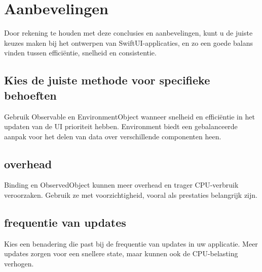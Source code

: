 \newpage
\section{Aanbevelingen}
Door rekening te houden met deze conclusies en aanbevelingen, kunt u de juiste keuzes maken bij het ontwerpen van SwiftUI-applicaties, en zo een goede balans vinden tussen efficiëntie, snelheid en consistentie.
\subsection{Kies de juiste methode voor specifieke behoeften}
Gebruik Observable en EnvironmentObject wanneer snelheid en efficiëntie in het updaten van de UI prioriteit hebben.
Environment biedt een gebalanceerde aanpak voor het delen van data over verschillende componenten heen.
\subsection{overhead}
Binding en ObservedObject kunnen meer overhead en trager CPU-verbruik veroorzaken. Gebruik ze met voorzichtigheid, vooral als prestaties belangrijk zijn.
\subsection{frequentie van updates}
Kies een benadering die past bij de frequentie van updates in uw applicatie. Meer updates zorgen voor een snellere state, maar kunnen ook de CPU-belasting verhogen.




